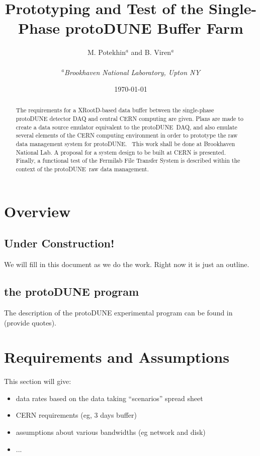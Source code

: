 \documentclass[pdftex,12pt,letter]{article}
\title{Prototyping and Test of the Single-Phase protoDUNE Buffer Farm}
\date{\today}
\author{M. Potekhin$^a$ and B. Viren$^a$\\
\ \\
$^a$\textit{Brookhaven National Laboratory, Upton NY}
}
\newcommand{\pd}{protoDUNE\ }
\newcommand{\pdd}{protoDUNE.\ }
\begin{document}
\maketitle

\begin{abstract}
The requirements for a XRootD-based data buffer between the single-phase
protoDUNE detector DAQ and central CERN computing are given.  Plans are made to
create a data source emulator equivalent to the  \pd DAQ, and also emulate several
elements of the CERN computing  environment in order to prototype the raw data management system for \pdd
This work shall be done at Brookhaven National Lab. A proposal for a system design to be built at CERN is presented.
Finally, a functional test of the Fermilab File Transfer System is described within the context of the \pd raw
data management.
\end{abstract}


\pagebreak


\section{Overview}
\subsection{Under Construction!}
We will fill in this document as we do the work.  Right now it is just
an outline.

\subsection{the protoDUNE program}
The description of the protoDUNE experimental program can be found in (provide quotes).

\section{Requirements and Assumptions}

This section will give:
\begin{itemize}
\item data rates based on the data taking ``scenarios'' spread sheet
\item CERN requirements (eg, 3 days buffer)
\item assumptions about various bandwidths (eg network and disk)
\item ...
\end{itemize}
\end{document}
